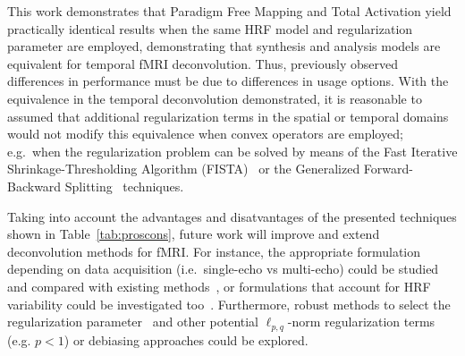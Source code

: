 This work demonstrates that Paradigm Free Mapping and Total Activation yield practically identical results when the same HRF model and regularization parameter are employed, demonstrating that synthesis and analysis models are equivalent for temporal fMRI deconvolution. Thus, previously observed differences in performance must be due to differences in usage options. With the equivalence in the temporal deconvolution demonstrated, it is reasonable to assumed that additional regularization terms in the spatial or temporal domains would not modify this equivalence when convex operators are employed; e.g.\ when the regularization problem can be solved by means of the Fast Iterative Shrinkage-Thresholding Algorithm (FISTA)~\cite{beck2009FastIterativeShrinkagethresholding} or the Generalized Forward-Backward Splitting~\cite{raguet2013GeneralizedForwardBackwardSplittinga} techniques.

Taking into account the advantages and disatvantages of the presented techniques shown in Table~\ref{tab:proscons}, future work will improve and extend deconvolution methods for fMRI. For instance, the appropriate formulation depending on data acquisition (i.e.\ single-echo vs multi-echo) could be studied and compared with existing methods~\cite{caballero-gaudes2019DeconvolutionAlgorithmMultiecho}, or formulations that account for HRF variability could be investigated too~\cite{badillo2013GrouplevelImpactsBetweensubject,gaudes2012StructuredSparseDeconvolution,farouj2019BoldSignalDeconvolution}. Furthermore, robust methods to select the regularization parameter~\cite{meinshausen2009StabilitySelection} and other potential \(\ell_{p,q}\)-norm regularization terms (e.g. \(p < 1\)) or debiasing approaches could be explored.